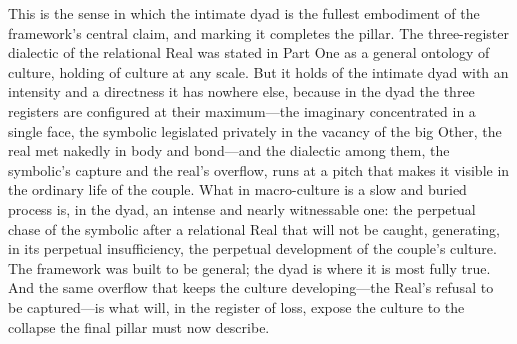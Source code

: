 This is the sense in which the intimate dyad is the fullest embodiment of the framework's central claim, and marking it completes the pillar. The three-register dialectic of the relational Real was stated in Part One as a general ontology of culture, holding of culture at any scale. But it holds of the intimate dyad with an intensity and a directness it has nowhere else, because in the dyad the three registers are configured at their maximum---the imaginary concentrated in a single face, the symbolic legislated privately in the vacancy of the big Other, the real met nakedly in body and bond---and the dialectic among them, the symbolic's capture and the real's overflow, runs at a pitch that makes it visible in the ordinary life of the couple. What in macro-culture is a slow and buried process is, in the dyad, an intense and nearly witnessable one: the perpetual chase of the symbolic after a relational Real that will not be caught, generating, in its perpetual insufficiency, the perpetual development of the couple's culture. The framework was built to be general; the dyad is where it is most fully true. And the same overflow that keeps the culture developing---the Real's refusal to be captured---is what will, in the register of loss, expose the culture to the collapse the final pillar must now describe.
